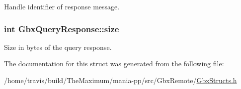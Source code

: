Handle identifier of response message. 

\hypertarget{structGbxQueryResponse_a0633cc01128e5eee2edba3ee503db1c4}{
\subsubsection[{size}]{\setlength{\rightskip}{0pt plus 5cm}int Gbx\-Query\-Response\-::size}}\label{structGbxQueryResponse_a0633cc01128e5eee2edba3ee503db1c4}


Size in bytes of the query response. 



The documentation for this struct was generated from the following file\-:\begin{DoxyCompactItemize}
\item 
/home/travis/build/\-The\-Maximum/mania-\/pp/src/\-Gbx\-Remote/\hyperlink{GbxStructs_8h}{Gbx\-Structs.\-h}\end{DoxyCompactItemize}
